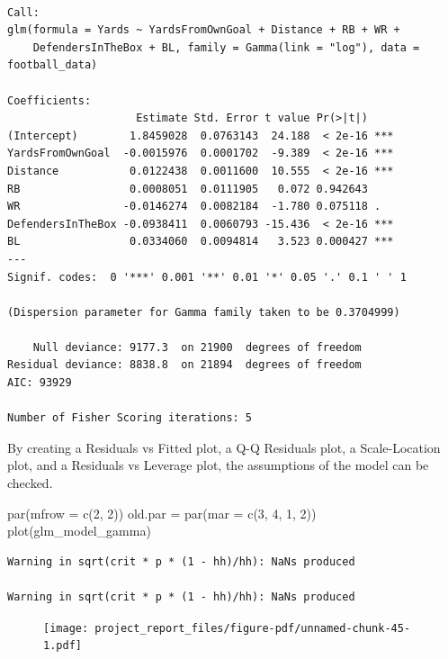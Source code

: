 \documentclass[
  super,
  preprint,
  3p]{elsarticle}
\newenvironment{Shaded}{\begin{snugshade}}{\end{snugshade}}
\newcommand{\AttributeTok}[1]{\textcolor[rgb]{0.40,0.45,0.13}{#1}}
\newcommand{\DecValTok}[1]{\textcolor[rgb]{0.68,0.00,0.00}{#1}}
\newcommand{\FunctionTok}[1]{\textcolor[rgb]{0.28,0.35,0.67}{#1}}
\newcommand{\NormalTok}[1]{\textcolor[rgb]{0.00,0.23,0.31}{#1}}
\newcommand{\OtherTok}[1]{\textcolor[rgb]{0.00,0.23,0.31}{#1}}
\begin{document}
\begin{verbatim}

Call:
glm(formula = Yards ~ YardsFromOwnGoal + Distance + RB + WR + 
    DefendersInTheBox + BL, family = Gamma(link = "log"), data = football_data)

Coefficients:
                    Estimate Std. Error t value Pr(>|t|)    
(Intercept)        1.8459028  0.0763143  24.188  < 2e-16 ***
YardsFromOwnGoal  -0.0015976  0.0001702  -9.389  < 2e-16 ***
Distance           0.0122438  0.0011600  10.555  < 2e-16 ***
RB                 0.0008051  0.0111905   0.072 0.942643    
WR                -0.0146274  0.0082184  -1.780 0.075118 .  
DefendersInTheBox -0.0938411  0.0060793 -15.436  < 2e-16 ***
BL                 0.0334060  0.0094814   3.523 0.000427 ***
---
Signif. codes:  0 '***' 0.001 '**' 0.01 '*' 0.05 '.' 0.1 ' ' 1

(Dispersion parameter for Gamma family taken to be 0.3704999)

    Null deviance: 9177.3  on 21900  degrees of freedom
Residual deviance: 8838.8  on 21894  degrees of freedom
AIC: 93929

Number of Fisher Scoring iterations: 5
\end{verbatim}

By creating a Residuals vs Fitted plot, a Q-Q Residuals plot, a
Scale-Location plot, and a Residuals vs Leverage plot, the assumptions
of the model can be checked.

\begin{Shaded}
\begin{Highlighting}[]
\FunctionTok{par}\NormalTok{(}\AttributeTok{mfrow =} \FunctionTok{c}\NormalTok{(}\DecValTok{2}\NormalTok{, }\DecValTok{2}\NormalTok{))}
\NormalTok{old.par }\OtherTok{=} \FunctionTok{par}\NormalTok{(}\AttributeTok{mar =} \FunctionTok{c}\NormalTok{(}\DecValTok{3}\NormalTok{, }\DecValTok{4}\NormalTok{, }\DecValTok{1}\NormalTok{, }\DecValTok{2}\NormalTok{))}
\FunctionTok{plot}\NormalTok{(glm\_model\_gamma)}
\end{Highlighting}
\end{Shaded}

\begin{verbatim}
Warning in sqrt(crit * p * (1 - hh)/hh): NaNs produced

Warning in sqrt(crit * p * (1 - hh)/hh): NaNs produced
\end{verbatim}

\begin{figure}[H]

{\centering \texttt{[image: project\_report\_files/figure-pdf/unnamed-chunk-45-1.pdf]}

}

\end{figure}
\end{document}
